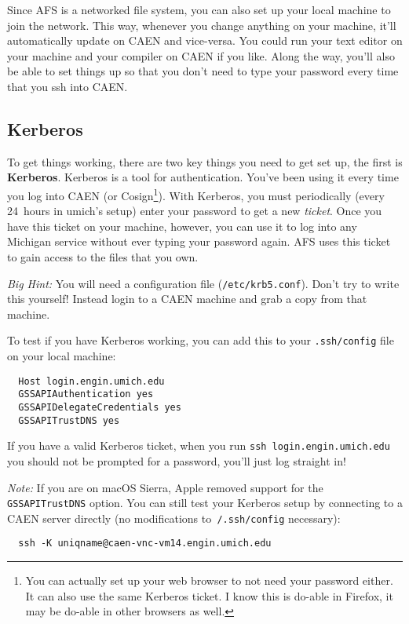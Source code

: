 \documentclass{article}
\begin{document}
Since AFS is a networked file system, you can also set up your local machine
to join the network.  This way, whenever you change anything on your machine,
it'll automatically update on CAEN and vice-versa. You could run your text
editor on your machine and your compiler on CAEN if you like. Along the way,
you'll also be able to set things up so that you don't need to type your
password every time that you ssh into CAEN.


\subsection*{Kerberos}

To get things working, there are two key things you need to get set up, the
first is \textbf{Kerberos}. Kerberos is a tool for authentication. You've been
using it every time you log into CAEN (or Cosign\footnote{
  You can actually set up your web browser to not need your password either.
  It can also use the same Kerberos ticket. I know this is do-able in Firefox,
  it may be do-able in other browsers as well.
}). With Kerberos, you must periodically (every 24~hours in umich's setup)
enter your password to get a new \emph{ticket}. Once you have this ticket on
your machine, however, you can use it to log into any Michigan service without
ever typing your password again. AFS uses this ticket to gain access to the
files that you own.

\emph{Big Hint:} You will need a configuration file (\texttt{/etc/krb5.conf}).
Don't try to write this yourself! Instead login to a CAEN machine and grab a
copy from that machine.

To test if you have Kerberos working, you can add this to your
\texttt{.ssh/config} file on your local machine:

\begin{lstlisting}
  Host login.engin.umich.edu
  GSSAPIAuthentication yes
  GSSAPIDelegateCredentials yes
  GSSAPITrustDNS yes
\end{lstlisting}

If you have a valid Kerberos ticket, when you run
\texttt{ssh~login.engin.umich.edu} you should not be prompted for a password,
you'll just log straight in!

\emph{Note:} If you are on macOS Sierra, Apple removed support for the
\texttt{GSSAPITrustDNS} option. You can still test your Kerberos setup by
connecting to a CAEN server directly (no modifications to\texttt{~/.ssh/config}
necessary):

\begin{lstlisting}
  ssh -K uniqname@caen-vnc-vm14.engin.umich.edu
\end{lstlisting}
\end{document}

